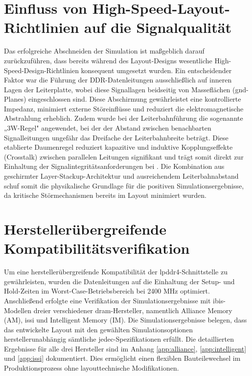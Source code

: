 \section{Einfluss von High-Speed-Layout-Richtlinien auf die Signalqualität}
Das erfolgreiche Abschneiden der Simulation ist maßgeblich darauf zurückzuführen, dass bereits während des Layout-Designs wesentliche High-Speed-Design-Richtlinien konsequent umgesetzt wurden. Ein entscheidender Faktor war die Führung der DDR-Datenleitungen ausschließlich auf inneren Lagen der Leiterplatte, wobei diese Signallagen beidseitig von Masseflächen (\gls{gnd}-Planes) eingeschlossen sind. Diese Abschirmung gewährleistet eine kontrollierte Impedanz, minimiert externe Störeinflüsse und reduziert die elektromagnetische Abstrahlung erheblich. Zudem wurde bei der Leiterbahnführung die sogenannte „3W-Regel" angewendet, bei der der Abstand zwischen benachbarten Signalleitungen ungefähr das Dreifache der Leiterbahnbreite beträgt. Diese etablierte Daumenregel reduziert kapazitive und induktive Kopplungseffekte (Crosstalk) zwischen parallelen Leitungen signifikant und trägt somit direkt zur Einhaltung der Signalintegritätsanforderungen bei \cite{nxp_lpddr4_guidelines}. Die Kombination aus geschirmter Layer-Stackup-Architektur und ausreichendem Leiterbahnabstand schuf somit die physikalische Grundlage für die positiven Simulationsergebnisse, da kritische Störmechanismen bereits im Layout minimiert wurden.

\section{Herstellerübergreifende Kompatibilitätsverifikation}
Um eine herstellerübergreifende Kompatibilität der \gls{lpddr4}-Schnittstelle zu gewährleisten, wurden die Datenleitungen auf die Einhaltung der Setup- und Hold-Zeiten im Worst-Case-Betriebsbereich bei 2400 MHz optimiert. Anschließend erfolgte eine Verifikation der Simulationsergebnisse mit \gls{ibis}-Modellen dreier verschiedener \gls{dram}-Hersteller, namentlich Alliance Memory (AM), \gls{issi} und Intelligent Memory (IM). Die Simulationsergebnisse belegen, dass das entwickelte Layout mit den gewählten Simulationsoptionen herstellerunabhängig sämtliche \gls{jedec}-Spezifikationen erfüllt. Die detaillierten Ergebnisse für alle drei Hersteller sind im Anhang \ref{app:alliance}, \ref{app:intelligent} und \ref{app:issi} dokumentiert. Dies ermöglicht einen flexiblen Bauteilewechsel im Produktionsprozess ohne layouttechnische Modifikationen.


